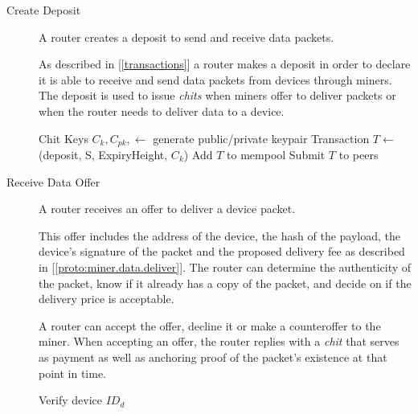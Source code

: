 \documentclass[10pt, nonatbib, nocopyrightspace, reprint]{sigplanconf}
\newenvironment{protocol}[2]{
  \begin{algorithm}[!htb]
    \DontPrintSemicolon
    \caption{#1}\label{#2}
}{
  \end{algorithm}
  \FloatBarrier
}
\newcommand{\protoref}[1]{[\autoref{#1}]}
\newcommand{\secref}[1]{[\autoref{#1}]}
\begin{document}
\begin{description}

\item [Create Deposit] A router creates a deposit to send and receive data packets.

  As described in \secref{transactions} a router makes a deposit in order to declare it is able to receive and send data packets from devices through miners. The deposit is used to issue \emph{chits} when miners offer to deliver packets or when the router needs to deliver data to a device.

    \begin{protocol}{Router Create Deposit}{proto:router.deposit}

       {
        Chit Keys $C_k, C_{pk}, \leftarrow $ generate public/private keypair \;
        Transaction $T \leftarrow $ \Transaction(deposit, S, ExpiryHeight, $C_k$) \;
        Add $T$ to mempool\;
        Submit $T$ to peers\;
      }
    \end{protocol}



  \item [Receive Data Offer] A router receives an offer to deliver a device packet.

    This offer includes the address of the device, the hash of the payload, the device's signature of the packet and the proposed delivery fee as described in \protoref{proto:miner.data.deliver}. The router can determine the authenticity of the packet, know if it already has a copy of the packet, and decide on if the delivery price is acceptable.

    A router can accept the offer, decline it or make a counteroffer to the miner. When accepting an offer, the router replies with a \emph{chit} that serves as payment as well as anchoring proof of the packet's existence at that point in time.

    \begin{protocol}{Router Receive Data Offer}{proto:router.offer.recv}

       {
        Verify device $ID_d$ \;
      }
    \end{protocol}




\end{description}
\end{document}
